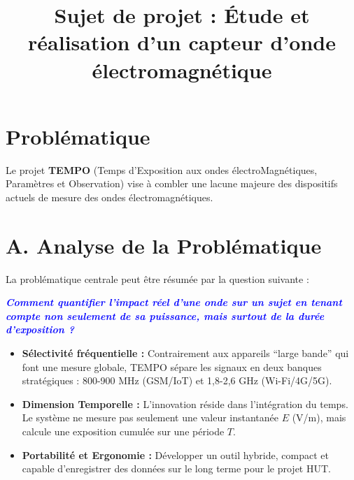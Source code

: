 \documentclass[12pt,a4paper]{article}
\title{Sujet de projet : Étude et réalisation d’un capteur d’onde électromagnétique}
\author{}
\date{}
\begin{document}
\maketitle
\section{Problématique}
Le projet \textbf{TEMPO} (Temps d'Exposition aux ondes électroMagnétiques, Paramètres et Observation) vise à combler une lacune majeure des dispositifs actuels de mesure des ondes électromagnétiques.

\section*{A. Analyse de la Problématique}

La problématique centrale peut être résumée par la question suivante : 
\begin{center}
    \textcolor{blue}{\textit{\textbf{Comment quantifier l'impact réel d'une onde sur un sujet en tenant compte non seulement de sa puissance, mais surtout de la durée d'exposition ?}}}
\end{center}

\begin{itemize}
    \item \textbf{Sélectivité fréquentielle :} Contrairement aux appareils ``large bande'' qui font une mesure globale, TEMPO sépare les signaux en deux banques stratégiques : 800-900 MHz (GSM/IoT) et 1,8-2,6 GHz (Wi-Fi/4G/5G).\\
    
    \item \textbf{Dimension Temporelle :} L'innovation réside dans l'intégration du temps. Le système ne mesure pas seulement une valeur instantanée $E$ (V/m), mais calcule une exposition cumulée sur une période $T$.\\
    
    \item \textbf{Portabilité et Ergonomie :} Développer un outil hybride, compact et capable d'enregistrer des données sur le long terme pour le projet HUT.
\end{itemize}
\end{document}
